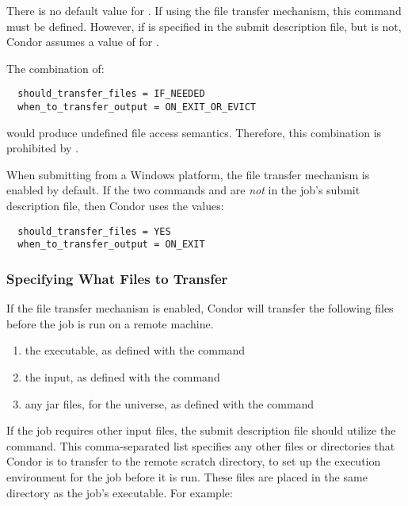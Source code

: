 There is no default value for .
If using the file transfer mechanism, 
this command must be defined.
However, if  is specified in the submit
description file,
but  is not, Condor assumes a
value of \verb@YES@ for .

\Note The combination of:
\begin{verbatim}
  should_transfer_files = IF_NEEDED
  when_to_transfer_output = ON_EXIT_OR_EVICT
\end{verbatim}
would produce undefined file access semantics.
Therefore, this combination is prohibited by .

When submitting from a Windows platform,
the file transfer mechanism is enabled by default.
If the two commands  and
 are \emph{not} in the job's
submit description file, then Condor uses the values:

\begin{verbatim}
  should_transfer_files = YES
  when_to_transfer_output = ON_EXIT
\end{verbatim}


\subsubsection{Specifying What Files to Transfer}

If the file transfer mechanism is enabled,
Condor will transfer the following files before the job
is run on a remote machine.
\begin{enumerate}
  \item the executable, as defined with the  command
  \item the input, as defined with the  command
  \item any jar files, for the  universe,
  as defined with the  command
\end{enumerate}
If the job requires other input files,
the submit description file should utilize the
 command.
This comma-separated list specifies any other files or directories that Condor is to
transfer to the remote scratch directory,
to set up the execution environment for the job before it is run.
These files are placed in the same directory as the job's executable.
For example:

